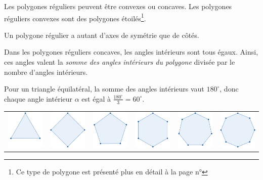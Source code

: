 \documentclass[a4paper, twoside]{article}
\begin{document}
Les polygones réguliers peuvent être convexes ou concaves.
Les polygones réguliers convexes sont des polygones étoilés\footnote{
	Ce type de polygone est présenté plus en détail à la page n°\pageref*{polygone_etoile}
}.

Un polygone régulier a autant d'axes de symétrie que de côtés.

Dans les polygones réguliers concaves, les angles intérieurs sont tous égaux.
Ainsi, ces angles valent la \textit{somme des angles intérieurs du polygone} divisée par le nombre d'angles intérieurs.

Pour un triangle équilatéral,
la somme des angles intérieurs vaut $180^\circ$,
donc chaque angle intérieur $\alpha$ est égal à $\frac{180^\circ}{3} = 60^\circ$.

\begin{center}
	\begin{tabular}{cccccc}
		\includegraphics[width=2cm]{Image/Polygones Reguliers/Triangle equilateral.png} &
		\includegraphics[width=2cm]{Image/Polygones Reguliers/Carre.png}                &
		\includegraphics[width=2cm]{Image/Polygones Reguliers/Pentagone regulier.png}   &
		\includegraphics[width=2cm]{Image/Polygones Reguliers/Hexagone regulier.png}    &
		\includegraphics[width=2cm]{Image/Polygones Reguliers/Heptagone regulier.png}   &
		\includegraphics[width=2cm]{Image/Polygones Reguliers/Octogone regulier.png}    \\


\end{tabular}
\end{center}
\end{document}
